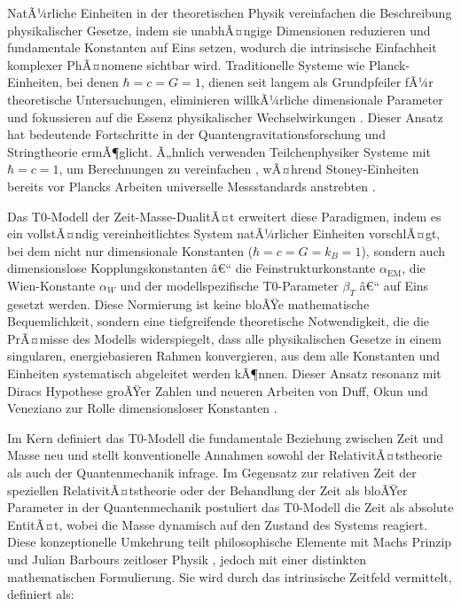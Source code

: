 ﻿\documentclass[twocolumn,aps,prl]{revtex4-2}
\begin{document}
	NatÃ¼rliche Einheiten in der theoretischen Physik vereinfachen die Beschreibung physikalischer Gesetze, indem sie unabhÃ¤ngige Dimensionen reduzieren und fundamentale Konstanten auf Eins setzen, wodurch die intrinsische Einfachheit komplexer PhÃ¤nomene sichtbar wird. Traditionelle Systeme wie Planck-Einheiten, bei denen \(\hbar = c = G = 1\), dienen seit langem als Grundpfeiler fÃ¼r theoretische Untersuchungen, eliminieren willkÃ¼rliche dimensionale Parameter und fokussieren auf die Essenz physikalischer Wechselwirkungen \cite{Planck1899}. Dieser Ansatz hat bedeutende Fortschritte in der Quantengravitationsforschung \cite{Rovelli2004, Ashtekar2007} und Stringtheorie \cite{Greene1999} ermÃ¶glicht. Ã„hnlich verwenden Teilchenphysiker Systeme mit \(\hbar = c = 1\), um Berechnungen zu vereinfachen \cite{Peskin1995}, wÃ¤hrend Stoney-Einheiten bereits vor Plancks Arbeiten universelle Messstandards anstrebten \cite{Stoney1881}.
	
	Das T0-Modell der Zeit-Masse-DualitÃ¤t erweitert diese Paradigmen, indem es ein vollstÃ¤ndig vereinheitlichtes System natÃ¼rlicher Einheiten vorschlÃ¤gt, bei dem nicht nur dimensionale Konstanten (\(\hbar = c = G = k_B = 1\)), sondern auch dimensionslose Kopplungskonstanten â€“ die Feinstrukturkonstante \(\alpha_{\text{EM}}\), die Wien-Konstante \(\alpha_W\) und der modellspezifische T0-Parameter \(\beta_T\) â€“ auf Eins gesetzt werden. Diese Normierung ist keine bloÃŸe mathematische Bequemlichkeit, sondern eine tiefgreifende theoretische Notwendigkeit, die die PrÃ¤misse des Modells widerspiegelt, dass alle physikalischen Gesetze in einem singularen, energiebasieren Rahmen konvergieren, aus dem alle Konstanten und Einheiten systematisch abgeleitet werden kÃ¶nnen. Dieser Ansatz resonanz mit Diracs Hypothese groÃŸer Zahlen \cite{Dirac1937} und neueren Arbeiten von Duff, Okun und Veneziano zur Rolle dimensionsloser Konstanten \cite{Duff2002}.
	
	Im Kern definiert das T0-Modell die fundamentale Beziehung zwischen Zeit und Masse neu und stellt konventionelle Annahmen sowohl der RelativitÃ¤tstheorie als auch der Quantenmechanik infrage. Im Gegensatz zur relativen Zeit der speziellen RelativitÃ¤tstheorie \cite{Einstein1905} oder der Behandlung der Zeit als bloÃŸer Parameter in der Quantenmechanik \cite{Schrodinger1926} postuliert das T0-Modell die Zeit als absolute EntitÃ¤t, wobei die Masse dynamisch auf den Zustand des Systems reagiert. Diese konzeptionelle Umkehrung teilt philosophische Elemente mit Machs Prinzip \cite{Mach1893} und Julian Barbours zeitloser Physik \cite{Barbour1999}, jedoch mit einer distinkten mathematischen Formulierung. Sie wird durch das intrinsische Zeitfeld vermittelt, definiert als:
	
\end{document}
